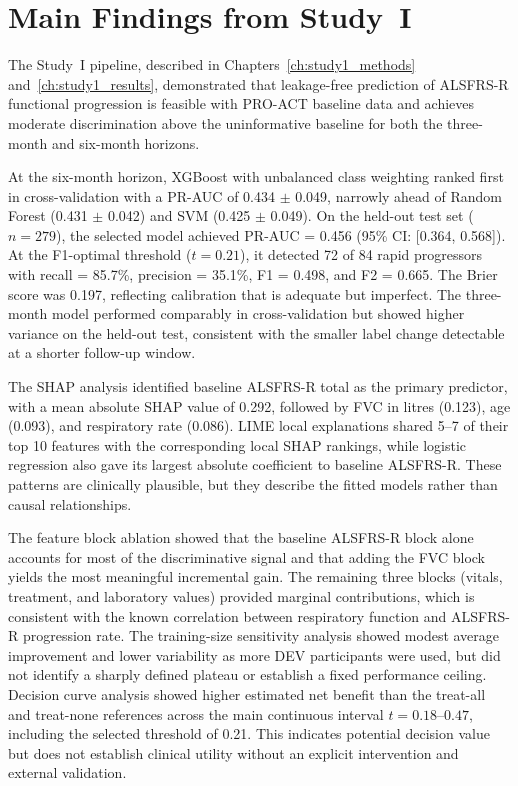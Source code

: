 \section{Main Findings from Study~I}
\label{sec:conclusion_study1}

The Study~I pipeline, described in Chapters~\ref{ch:study1_methods} and~\ref{ch:study1_results}, demonstrated that leakage-free prediction of \gls{ALSFRS-R} functional progression is feasible with \gls{PRO-ACT} baseline data and achieves moderate discrimination above the uninformative baseline for both the three-month and six-month horizons.

At the six-month horizon, XGBoost with unbalanced class weighting ranked first in cross-validation with a \gls{PR-AUC} of 0.434 $\pm$ 0.049, narrowly ahead of Random Forest (0.431 $\pm$ 0.042) and \gls{SVM} (0.425 $\pm$ 0.049). On the held-out test set ($n = 279$), the selected model achieved \gls{PR-AUC} = 0.456 (95\% \gls{CI}: [0.364, 0.568]). At the F1-optimal threshold ($t = 0.21$), it detected 72 of 84 rapid progressors with recall = 85.7\%, precision = 35.1\%, F1 = 0.498, and F2 = 0.665. The Brier score was 0.197, reflecting calibration that is adequate but imperfect. The three-month model performed comparably in cross-validation but showed higher variance on the held-out test, consistent with the smaller label change detectable at a shorter follow-up window.

The \gls{SHAP} analysis identified baseline \gls{ALSFRS-R} total as the primary predictor, with a mean absolute \gls{SHAP} value of 0.292, followed by \gls{FVC} in litres (0.123), age (0.093), and respiratory rate (0.086). \gls{LIME} local explanations shared 5--7 of their top 10 features with the corresponding local \gls{SHAP} rankings, while logistic regression also gave its largest absolute coefficient to baseline \gls{ALSFRS-R}. These patterns are clinically plausible, but they describe the fitted models rather than causal relationships.

The feature block ablation showed that the baseline \gls{ALSFRS-R} block alone accounts for most of the discriminative signal and that adding the \gls{FVC} block yields the most meaningful incremental gain. The remaining three blocks (vitals, treatment, and laboratory values) provided marginal contributions, which is consistent with the known correlation between respiratory function and \gls{ALSFRS-R} progression rate. The training-size sensitivity analysis showed modest average improvement and lower variability as more DEV participants were used, but did not identify a sharply defined plateau or establish a fixed performance ceiling. Decision curve analysis showed higher estimated net benefit than the treat-all and treat-none references across the main continuous interval $t=0.18$--$0.47$, including the selected threshold of 0.21. This indicates potential decision value but does not establish clinical utility without an explicit intervention and external validation.

